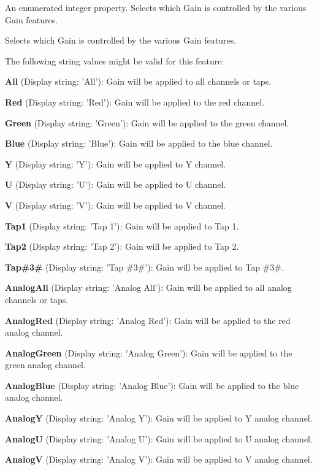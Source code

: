 An enumerated integer property. Selects which Gain is controlled by the various Gain features. 

Selects which Gain is controlled by the various Gain features.

The following string values might be valid for this feature\+:
\begin{DoxyItemize}
\item {\bfseries All} (Display string\+: 'All')\+: Gain will be applied to all channels or taps.
\item {\bfseries Red} (Display string\+: 'Red')\+: Gain will be applied to the red channel.
\item {\bfseries Green} (Display string\+: 'Green')\+: Gain will be applied to the green channel.
\item {\bfseries Blue} (Display string\+: 'Blue')\+: Gain will be applied to the blue channel.
\item {\bfseries Y} (Display string\+: 'Y')\+: Gain will be applied to Y channel.
\item {\bfseries U} (Display string\+: 'U')\+: Gain will be applied to U channel.
\item {\bfseries V} (Display string\+: 'V')\+: Gain will be applied to V channel.
\item {\bfseries Tap1} (Display string\+: 'Tap 1')\+: Gain will be applied to Tap 1.
\item {\bfseries Tap2} (Display string\+: 'Tap 2')\+: Gain will be applied to Tap 2.
\item {\bfseries Tap\#3\#} (Display string\+: 'Tap \#3\#')\+: Gain will be applied to Tap \#3\#.
\item {\bfseries Analog\+All} (Display string\+: 'Analog All')\+: Gain will be applied to all analog channels or taps.
\item {\bfseries Analog\+Red} (Display string\+: 'Analog Red')\+: Gain will be applied to the red analog channel.
\item {\bfseries Analog\+Green} (Display string\+: 'Analog Green')\+: Gain will be applied to the green analog channel.
\item {\bfseries Analog\+Blue} (Display string\+: 'Analog Blue')\+: Gain will be applied to the blue analog channel.
\item {\bfseries Analog\+Y} (Display string\+: 'Analog Y')\+: Gain will be applied to Y analog channel.
\item {\bfseries Analog\+U} (Display string\+: 'Analog U')\+: Gain will be applied to U analog channel.
\item {\bfseries Analog\+V} (Display string\+: 'Analog V')\+: Gain will be applied to V analog channel.

\end{DoxyItemize}
